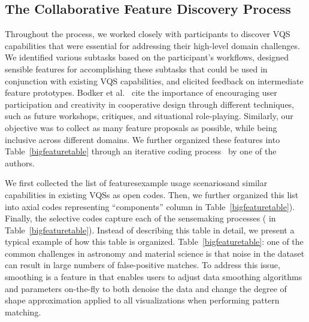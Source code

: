  \subsection{The Collaborative Feature Discovery Process~\label{sec:feature_dsicovery}}
 \par Throughout the  process, we worked closely with participants to discover VQS capabilities that were essential for addressing their high-level domain challenges. We identified various subtasks based on the participant's workflows, designed sensible features for accomplishing these subtasks that could be used in conjunction with existing VQS capabilities, and elicited feedback on intermediate feature prototypes. Bodker et al.~\cite{BodkerGronbaek} cite the importance of encouraging user participation and creativity in cooperative design through different techniques, such as future workshops, critiques, and situational role-playing. Similarly, our objective was to collect as many feature proposals as possible, while being inclusive across different domains. We further organized these features into Table~\ref{bigfeaturetable} through an iterative coding process~\cite{Muller2012} by one of the authors.
 \par {} We first collected the list of features\rchange{, }example usage scenarios\rchange{, }and similar capabilities in existing VQSs as open codes. Then, we further organized this list into axial codes representing ``components'' column in Table~\ref{bigfeaturetable}). Finally, the selective codes capture each of the sensemaking processes ( in Table~\ref{bigfeaturetable}). Instead of describing this table in detail, we present a typical example of how this table is organized.  Table~\ref{bigfeaturetable}: one of the common challenges in astronomy and material science is that noise in the dataset can result in large numbers of false-positive matches. To address this issue, smoothing is a feature in \zvpp that enables users to adjust data smoothing algorithms and parameters on-the-fly to both denoise the data and change the degree of shape approximation applied to all visualizations when performing pattern matching. %
